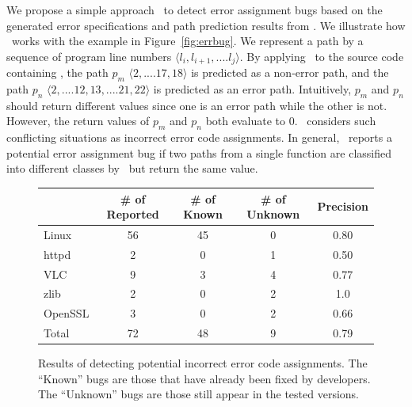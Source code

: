 \documentclass[12pt]{report}	%
\begin{document}
We propose a simple approach \bugTool\ to detect error assignment bugs based on the 
generated error specifications and path prediction results from \newTool.
%
We illustrate how \bugTool\ works with the example in Figure~\ref{fig:errbug}. 
We represent a path by a sequence of program line numbers $\langle l_i, l_{i+1}, ....l_j \rangle$.
By applying \newTool\ to the source code containing ,
the path $p_m$ $\langle 2, ....17, 18 \rangle$ is predicted as a non-error path,
and the path $p_n$ $\langle 2, ....12, 13, .... 21, 22 \rangle$ is predicted as an error path.
Intuitively, $p_m$ and $p_n$ should return different values since one is an
error path while the other is not.
However, the return values of $p_m$ and $p_n$ both evaluate to 0.
\bugTool\ considers such conflicting situations as incorrect error code assignments. 
In general, \bugTool\ reports a potential error
assignment bug if two paths from a single function are classified into
different classes  by \newTool\ but return the same value.


\begin{figure}
\centering
\begin{tabular}{l | c | c | c | c }
\toprule
& \# of Reported & \# of Known  & \# of Unknown & Precision \\
\midrule
Linux & 56 & 45 & 0 & 0.80 \\
httpd & 2 & 0 & 1 & 0.50 \\
VLC &  9 &  3 & 4 & 0.77 \\
zlib &  2 &  0 & 2 & 1.0 \\
OpenSSL & 3 & 0 & 2 & 0.66 \\
\midrule
Total & 72 &  48 & 9 & 0.79 \\
\bottomrule
\end{tabular}
\caption{Results of detecting potential incorrect error code assignments.
The ``Known'' bugs are those that have already been fixed by developers. 
The ``Unknown'' bugs are 
those still appear in the tested versions.
}
\label{fig:bugsum}
\end{figure}
\end{document}
